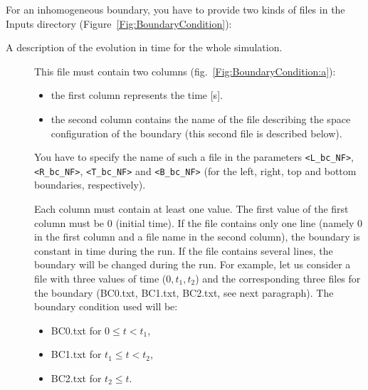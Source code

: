 \documentclass[a4paper, 11pt]{article}
\begin{document}
For an inhomogeneous boundary, you have to provide two kinds of files in the \textsf{Inputs} directory (Figure~\ref{Fig:BoundaryCondition}):
\begin{description}
	\item[A description of the evolution in time for the whole simulation.]
	      This file must contain two columns (fig.~\ref{Fig:BoundaryCondition:a}):
	      \begin{itemize}
		      \item the first column represents the time [\si{\second}].
		      \item the second column contains the name of the file describing the space configuration of the boundary (this second file is described below).
	      \end{itemize}

	      You have to specify the name of such a file in the parameters \texttt{<L\_bc\_NF>}, \texttt{<R\_bc\_NF>}, \texttt{<T\_bc\_NF>} and \texttt{<B\_bc\_NF>} (for the left, right, top and bottom boundaries, respectively).

	      Each column must contain at least one value.
	      The first value of the first column must be 0 (initial time).
	      If the file contains only one line (namely 0 in the first column and a file name in the second column), the boundary is constant in time during the run.
	      If the file contains several lines, the boundary will be changed during the run.
	      For example, let us consider a file with three values of time (\(0, t_1, t_2\)) and the corresponding three files for the boundary (\textsf{BC0.txt}, \textsf{BC1.txt}, \textsf{BC2.txt}, see next paragraph).
	      The boundary condition used will be:
	      \begin{itemize}
		      \item \textsf{BC0.txt} for \(0   \leq t < t_1\),
		      \item \textsf{BC1.txt} for \(t_1 \leq t < t_2\),
		      \item \textsf{BC2.txt} for \(t_2 \leq t\).
	      \end{itemize}


\end{description}
\end{document}
